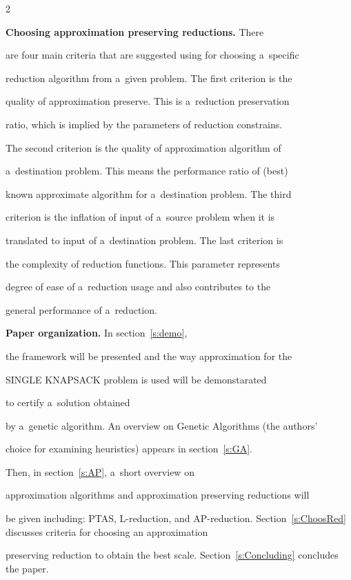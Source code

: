 \begin{multicols}{2}
\noindent


\textbf{Choosing approximation preserving reductions.} There


are four main criteria that are suggested using for choosing a~specific


reduction algorithm from a~given problem. The first criterion is the


quality of approximation preserve. This is a~reduction preservation


ratio, which is implied by the parameters of reduction constrains.


The second criterion is the quality of approximation algorithm of


a~destination problem. This means the performance ratio of (best)


known approximate algorithm for a~destination problem. The third


criterion is the inflation of input of a~source problem when it is


translated to input of a~destination problem. The last criterion is


the complexity of reduction functions. This parameter represents


degree of ease of a~reduction usage and also contributes to the


general performance of a~reduction.





\noindent


\textbf{Paper organization.} In section~\ref{s:demo},


the framework will be presented and the way approximation for the


{SINGLE KNAPSACK} problem is used will be demonstarated


to certify a~solution obtained


by a~genetic algorithm. An overview on Genetic Algorithms (the authors'


choice for examining heuristics) appears in section~\ref{s:GA}.


Then, in section~\ref{s:AP}, a~short overview on


approximation algorithms and approximation preserving reductions will


be given including: PTAS, L-reduction, and AP-reduction. Section~\ref{s:ChoosRed} discusses criteria for choosing an approximation


preserving reduction to obtain the best scale. Section~\ref{s:Concluding} concludes the paper.






\end{multicols}
